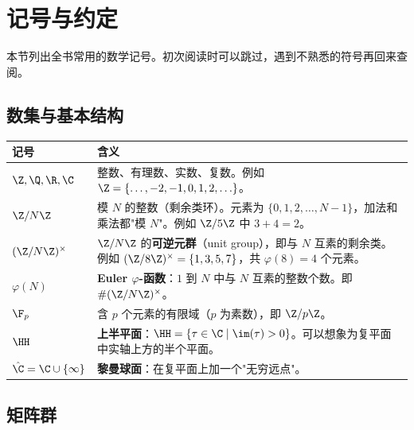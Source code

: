 \section*{记号与约定}
\label{sec:notation}

本节列出全书常用的数学记号。初次阅读时可以跳过，遇到不熟悉的符号再回来查阅。

\subsection*{数集与基本结构}

\begin{longtable}{@{}p{3.5cm}p{10cm}@{}}
\toprule
\textbf{记号} & \textbf{含义} \\
\midrule
$\Z, \Q, \R, \C$ &
  整数、有理数、实数、复数。例如 $\Z = \{\ldots, -2, -1, 0, 1, 2, \ldots\}$。 \\[4pt]
$\Z/N\Z$ &
  模 $N$ 的整数（剩余类环）。元素为 $\{0, 1, 2, \ldots, N-1\}$，加法和乘法都"模 $N$"。例如 $\Z/5\Z$ 中 $3 + 4 = 2$。 \\[4pt]
$(\Z/N\Z)^\times$ &
  $\Z/N\Z$ 的\textbf{可逆元群}（unit group），即与 $N$ 互素的剩余类。例如 $(\Z/8\Z)^\times = \{1, 3, 5, 7\}$，共 $\varphi(8) = 4$ 个元素。 \\[4pt]
$\varphi(N)$ &
  \textbf{Euler $\varphi$-函数}：$1$ 到 $N$ 中与 $N$ 互素的整数个数。即 $\#(\Z/N\Z)^\times$。 \\[4pt]
$\F_p$ &
  含 $p$ 个元素的有限域（$p$ 为素数），即 $\Z/p\Z$。 \\[4pt]
$\HH$ &
  \textbf{上半平面}：$\HH = \{\tau \in \C \mid \im(\tau) > 0\}$。可以想象为复平面中实轴上方的半个平面。 \\[4pt]
$\hat\C = \C \cup \{\infty\}$ &
  \textbf{黎曼球面}：在复平面上加一个"无穷远点"。 \\
\bottomrule
\end{longtable}

\subsection*{矩阵群}

